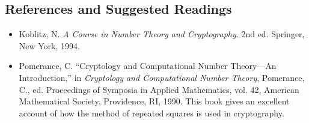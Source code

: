  
\subsection*{References and Suggested Readings}
 
 
{\small
\begin{itemize}
 
\item[{\bf [1]}] %
Koblitz, N. {\it A Course in Number Theory and Cryptography}. 2nd ed.
Springer, New York, 1994.  
 
 
\item[{\bf [2]}]
Pomerance, C. ``Cryptology and Computational Number Theory---An
Introduction,'' in {\it Cryptology and Computational Number Theory},
Pomerance, C., ed. Proceedings of Symposia in Applied Mathematics,
vol. 42, American Mathematical Society, Providence, RI, 1990.  This
book gives an excellent account of how the method of repeated squares
is used in cryptography. 
 
\end{itemize}
}
 
 
 
